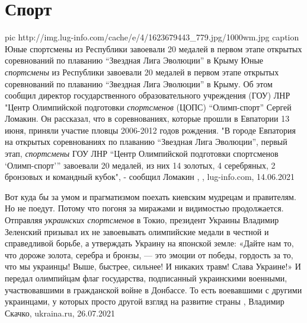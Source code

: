  
 
 
 
 
\chapter{Спорт}
\label{sec:slova.sport}

\ifcmt
  pic http://img.lug-info.com/cache/e/4/1623679443_779.jpg/1000wm.jpg
	caption Юные спортсмены из Республики завоевали 20 медалей в первом этапе открытых соревнований по плаванию \enquote{Звездная Лига Эволюции} в Крыму
\fi
Юные \emph{спортсмены} из Республики завоевали 20 медалей в первом этапе открытых
соревнований по плаванию \enquote{Звездная Лига Эволюции} в Крыму. Об этом сообщил
директор государственного образовательного учреждения (ГОУ) ЛНР "Центр
Олимпийской подготовки \emph{спортсменов} (ЦОПС) \enquote{Олимп-спорт} Сергей Ломакин.
Он рассказал, что в соревнованиях, которые прошли в Евпатории 13 июня, приняли
участие пловцы 2006-2012 годов рождения.
"В городе Евпатория на открытых соревнованиях по плаванию 
\enquote{Звездная Лига
Эволюции}, первый этап, \emph{спортсмены} ГОУ ЛНР \enquote{Центр Олимпийской подготовки
спортсменов \enquote{Олимп-спорт}} завоевали 20 медалей, из них 14 золотых, 4
серебряных, 2 бронзовых и командный кубок", - сообщил Ломакин
, 
, lug-info.com, 14.06.2021

Вот куда бы за умом и прагматизмом поехать киевским мудрецам и правителям. Но
не поедут. Потому что погоня за миражами и видимостью продолжается. Отправляя
\emph{украинских спортсменов} в Токио, президент Украины Владимир Зеленский
призывал их не завоевывать олимпийские медали в честной и справедливой борьбе,
а утверждать Украину на японской земле: «Дайте нам то, что дороже золота,
серебра и бронзы, — это эмоции от победы, гордость за то, что мы украинцы!
Выше, быстрее, сильнее! И никаких травм! Слава Украине!» И передал олимпийцам
флаг государства, подписанный украинскими военными, участвовавшими в
гражданской войне в Донбассе. То есть воевавшими с другими украинцами, у
которых просто другой взгляд на развитие страны
, 
Владимир Скачко, ukraina.ru, 26.07.2021

